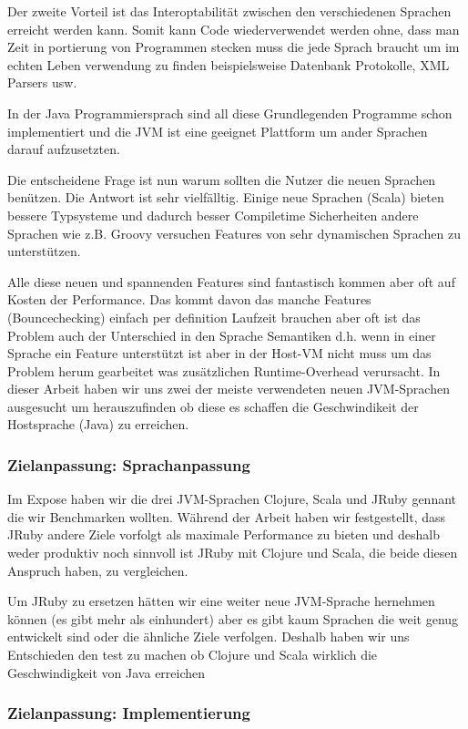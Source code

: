 \documentclass{fancydocument}
\begin{document}
Der zweite Vorteil ist das Interoptabilit\"at zwischen den
verschiedenen Sprachen erreicht werden kann. Somit kann Code
wiederverwendet werden ohne, dass man Zeit in portierung von
Programmen stecken muss die jede Sprach braucht um im echten Leben
verwendung zu finden beispielsweise Datenbank Protokolle, XML Parsers usw.

In der Java Programmiersprach sind all diese Grundlegenden Programme
schon implementiert und die JVM ist eine geeignet Plattform um ander
Sprachen darauf aufzusetzten.

Die entscheidene Frage ist nun warum sollten die Nutzer die neuen
Sprachen ben\"utzen. Die Antwort ist sehr vielf\"alltig. Einige neue
Sprachen (Scala) bieten bessere Typsysteme und dadurch besser
Compiletime Sicherheiten andere Sprachen wie z.B. Groovy versuchen Features
von sehr dynamischen Sprachen zu unterst\"utzen.

Alle diese neuen und spannenden Features sind fantastisch kommen aber
oft auf Kosten der Performance. Das kommt davon das manche Features (Bouncechecking)
einfach per definition Laufzeit brauchen aber oft ist das Problem auch der Unterschied in
den Sprache Semantiken d.h. wenn in einer Sprache ein Feature
unterst\"utzt ist aber in der Host-VM nicht muss um das Problem herum
gearbeitet was zus\"atzlichen Runtime-Overhead verursacht. In dieser
Arbeit haben wir uns zwei der meiste verwendeten neuen JVM-Sprachen
ausgesucht um herauszufinden ob diese es schaffen die Geschwindikeit
der Hostsprache (Java) zu erreichen.

\subsubsection{Zielanpassung: Sprachanpassung}

Im Expose haben wir die drei JVM-Sprachen Clojure, Scala und JRuby
gennant die wir Benchmarken wollten. W\"ahrend der Arbeit haben wir
festgestellt, dass JRuby andere Ziele vorfolgt als maximale
Performance zu bieten und deshalb weder produktiv noch sinnvoll ist
JRuby mit Clojure und Scala, die beide diesen Anspruch haben, zu
vergleichen.

Um JRuby zu ersetzen h\"atten wir eine weiter neue JVM-Sprache
hernehmen k\"onnen (es gibt mehr als einhundert) aber es gibt kaum
Sprachen die weit genug entwickelt sind oder die \"ahnliche Ziele
verfolgen. Deshalb haben wir uns Entschieden den test zu machen ob
Clojure und Scala wirklich die Geschwindigkeit von Java erreichen

\subsubsection{Zielanpassung: Implementierung}
\end{document}
